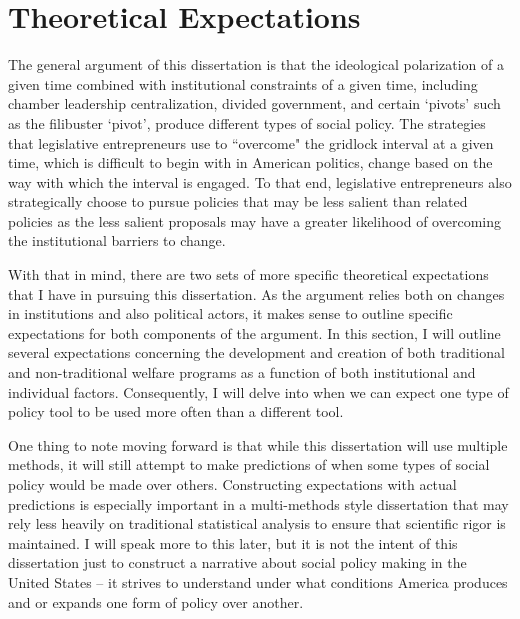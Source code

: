 \documentclass[12pt]{article}
\begin{document}
\section{Theoretical Expectations}
The general argument of this dissertation is that the ideological polarization of a given time combined with institutional constraints of a given time, including chamber leadership centralization, divided government, and certain `pivots' such as the filibuster `pivot', produce different types of social policy. The strategies that legislative entrepreneurs use to ``overcome" the gridlock interval at a given time, which is difficult to begin with in American politics, change based on the way with which the interval is engaged. To that end, legislative entrepreneurs also strategically choose to pursue policies that may be less salient than related policies as the less salient proposals may have a greater likelihood of overcoming the institutional barriers to change.

With that in mind, there are two sets of more specific theoretical expectations that I have in pursuing this dissertation. As the argument relies both on changes in institutions and also political actors, it makes sense to outline specific expectations for both components of the argument. In this section, I will outline several expectations concerning the development and creation of both traditional and non-traditional welfare programs as a function of both institutional and individual factors. Consequently, I will delve into when we can expect one type of policy tool to be used more often than a different tool.

One thing to note moving forward is that while this dissertation will use multiple methods, it will still attempt to make predictions of when some types of social policy would be made over others. Constructing expectations with actual predictions is especially important in a multi-methods style dissertation that may rely less heavily on traditional statistical analysis to ensure that scientific rigor is maintained. I will speak more to this later, but it is not the intent of this dissertation just to construct a narrative about social policy making in the United States -- it strives to understand under what conditions America produces and or expands one form of policy over another.
\end{document}
